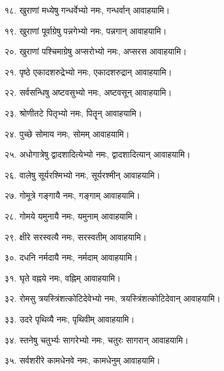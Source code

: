 १८. खुराणां मध्येषु गन्धर्वेभ्यो नमः, गन्धर्वान् आवाहयामि।

१९. खुराणां पूर्वाग्रेषु पन्नगेभ्यो नमः, पन्नगान् आवाहयामि।

२०. खुराणां पश्चिमाग्रेषु अप्सरोभ्यो नमः, अप्सरस आवाहयामि।

२१. पृष्ठे एकादशरुद्रेभ्यो नमः, एकादशरुद्रान् आवाहयामि।

२२. सर्वसन्धिषु अष्टवसुभ्यो नमः, अष्टवसून् आवाहयामि।

२३. श्रोणीतटे पितृभ्यो नमः, पितॄन् आवाहयामि।

२४. पुच्छे सोमाय नमः, सोमम् आवाहयामि।

२५. अधोगात्रेषु द्वादशादित्येभ्यो नमः, द्वादशादित्यान् आवाहयामि।

२६. वालेषु सूर्यरश्मिभ्यो नमः, सूर्यरश्मीन् आवाहयामि।

२७. गोमूत्रे गङ्गायै नमः, गङ्गाम् आवाहयामि।

२८. गोमये यमुनायै नमः, यमुनाम् आवाहयामि।

२९. क्षीरे सरस्वत्यै नमः, सरस्वतीम् आवाहयामि।

३०. दधनि नर्मदायै नमः, नर्मदाम् आवाहयामि।

३१. घृते वह्नये नमः, वह्निम् आवाहयामि।

३२. रोमसु त्रयस्त्रिंशत्कोटिदेवेभ्यो नमः, त्रयस्\-त्रिंशत्\-कोटि\-देवान् आवाहयामि।

३३. उदरे पृथिव्यै नमः, पृथिवीम् आवाहयामि।

३४. स्तनेषु चतुर्भ्यः सागरेभ्यो नमः, चतुरः सागरान् आवाहयामि।

३५. सर्वशरीरे कामधेनवे नमः, कामधेनुम् आवाहयामि।

